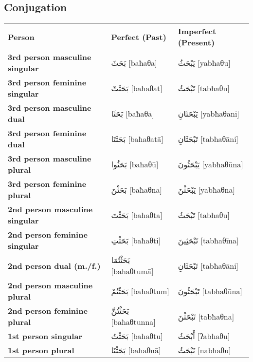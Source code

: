 \documentclass[letter,12pt]{article}
\begin{document}
\subsection{Conjugation}
\begin{longtable}{|>{\raggedright}p{3.5cm}|p{5cm}|p{5cm}|}
\hline
\textbf{Person} & \textbf{Perfect (Past)} & \textbf{Imperfect (Present)} \\
\hline
\textbf{3rd person masculine singular} & \textarabic{بَحَثَ} [baħaθa] & \textarabic{يَبْحَثُ} [yabħaθu] \\
\hline
\textbf{3rd person feminine singular} & \textarabic{بَحَثَتْ} [baħaθat] & \textarabic{تَبْحَثُ} [tabħaθu] \\
\hline
\textbf{3rd person masculine dual} & \textarabic{بَحَثَا} [baħaθā] & \textarabic{يَبْحَثَانِ} [yabħaθāni] \\
\hline
\textbf{3rd person feminine dual} & \textarabic{بَحَثَتَا} [baħaθatā] & \textarabic{تَبْحَثَانِ} [tabħaθāni] \\
\hline
\textbf{3rd person masculine plural} & \textarabic{بَحَثُوا} [baħaθū] & \textarabic{يَبْحَثُونَ} [yabħaθūna] \\
\hline
\textbf{3rd person feminine plural} & \textarabic{بَحَثْنَ} [baħaθna] & \textarabic{يَبْحَثْنَ} [yabħaθna] \\
\hline
\textbf{2nd person masculine singular} & \textarabic{بَحَثْتَ} [baħaθta] & \textarabic{تَبْحَثُ} [tabħaθu] \\
\hline
\textbf{2nd person feminine singular} & \textarabic{بَحَثْتِ} [baħaθti] & \textarabic{تَبْحَثِينَ} [tabħaθīna] \\
\hline
\textbf{2nd person dual (m./f.)} & \textarabic{بَحَثْتُمَا} [baħaθtumā] & \textarabic{تَبْحَثَانِ} [tabħaθāni] \\
\hline
\textbf{2nd person masculine plural} & \textarabic{بَحَثْتُمْ} [baħaθtum] & \textarabic{تَبْحَثُونَ} [tabħaθūna] \\
\hline
\textbf{2nd person feminine plural} & \textarabic{بَحَثْتُنَّ} [baħaθtunna] & \textarabic{تَبْحَثْنَ} [tabħaθna] \\
\hline
\textbf{1st person singular} & \textarabic{بَحَثْتُ} [baħaθtu] & \textarabic{أَبْحَثُ} [ʔabħaθu] \\
\hline
\textbf{1st person plural} & \textarabic{بَحَثْنَا} [baħaθnā] & \textarabic{نَبْحَثُ} [nabħaθu] \\
\hline
\end{longtable}
\end{document}
